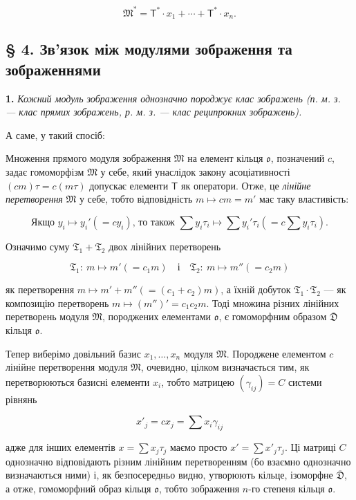 \documentclass[11pt]{article}
\begin{document}
\[
\mathfrak M^*=\mathsf T^*\cdot x_1+\cdots+\mathsf T^*\cdot x_n.
\]

\subsection*{§ 4. Зв'язок між модулями зображення та зображеннями}\label{der-zusammenhang-zwischen-darstellungsmoduln-und-darstellungen}

\textbf{1.} \emph{Кожний модуль зображення однозначно породжує клас зображень (п. м. з. --- клас прямих зображень, р. м. з. --- клас реципрокних зображень).}

А саме, у такий спосіб:

Множення прямого модуля зображення \(\mathfrak M\) на елемент кільця \(\mathfrak{o}\), позначений \(c\), задає гомоморфізм \(\mathfrak M\) у себе, який унаслідок закону асоціативності \((cm)\tau=c(m\tau)\) допускає елементи \(\mathsf T\) як оператори. Отже, це \emph{лінійне перетворення} \(\mathfrak M\) у себе, тобто відповідність \(m\mapsto cm=m'\) має таку властивість:

\[
\text{Якщо } y_i\mapsto y_i'(=cy_i) \text{, то також }
\sum y_i\tau_i\mapsto \sum y_i'\tau_i\left(=c\sum y_i\tau_i\right).
\]

Означимо суму \(\mathfrak T_1+\mathfrak T_2\) двох лінійних перетворень

\[
\mathfrak T_1:\ m\mapsto m'(=c_1m)
\quad\text{і}\quad
\mathfrak T_2:\ m\mapsto m''(=c_2m)
\]

як перетворення \(m\mapsto m'+m''(=(c_1+c_2)m)\), а їхній добуток \(\mathfrak T_1\cdot\mathfrak T_2\) --- як композицію перетворень \(m\mapsto (m'')'=c_1c_2m\). Тоді множина різних лінійних перетворень модуля \(\mathfrak M\), породжених елементами \(\mathfrak{o}\), є гомоморфним образом \(\overline{\mathfrak D}\) кільця \(\mathfrak{o}\).

Тепер виберімо довільний базис \(x_1,\ldots,x_n\) модуля \(\mathfrak M\). Породжене елементом \(c\) лінійне перетворення модуля \(\mathfrak M\), очевидно, цілком визначається тим, як перетворюються базисні елементи \(x_i\), тобто матрицею \((\gamma_{ij})=C\) системи рівнянь

\[
x'_j=cx_j=\sum x_i\gamma_{ij}
\]

адже для інших елементів \(x=\sum x_j\tau_j\) маємо просто \(x'=\sum x'_j\tau_j\). Ці матриці \(C\) однозначно відповідають різним лінійним перетворенням (бо взаємно однозначно визначаються ними) і, як безпосередньо видно, утворюють кільце, ізоморфне \(\overline{\mathfrak D}\), а отже, гомоморфний образ кільця \(\mathfrak{o}\), тобто зображення \(n\)-го степеня кільця \(\mathfrak{o}\).
\end{document}
